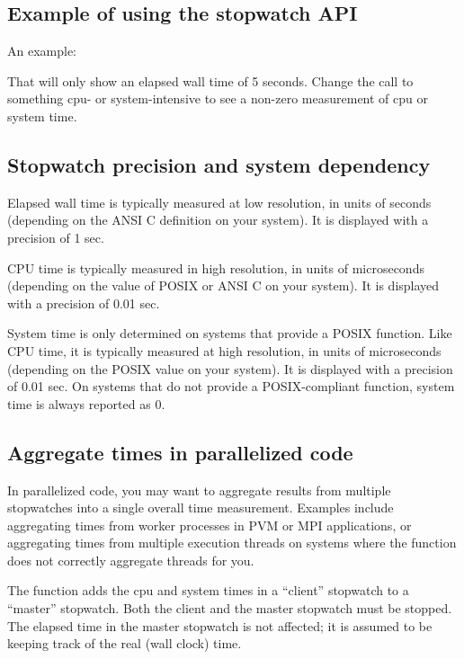 \subsection{Example of using the stopwatch API}

An example:



That will only show an elapsed wall time of 5 seconds.  Change the
 call to something cpu- or system-intensive to see a
non-zero measurement of cpu or system time.

\subsection{Stopwatch precision and system dependency}

Elapsed wall time is typically measured at low resolution, in units of
seconds (depending on the ANSI C  definition on your
system). It is displayed with a precision of 1 sec.

CPU time is typically measured in high resolution, in units of
microseconds (depending on the value of POSIX  or
ANSI C  on your system). It is displayed with a
precision of 0.01 sec.

System time is only determined on systems that provide a POSIX
 function. Like CPU time, it is typically measured at
high resolution, in units of microseconds (depending on the POSIX
 value on your system). It is displayed with a
precision of 0.01 sec.  On systems that do not provide a
POSIX-compliant  function, system time is always
reported as 0.

\subsection{Aggregate times in parallelized code}

In parallelized code, you may want to aggregate results from multiple
stopwatches into a single overall time measurement. Examples include
aggregating times from worker processes in PVM or MPI applications, or
aggregating times from multiple execution threads on systems where the
 function does not correctly aggregate threads for you.

The  function adds the cpu and system
times in a ``client'' stopwatch to a ``master'' stopwatch. Both the
client and the master stopwatch must be stopped. The elapsed time in
the master stopwatch is not affected; it is assumed to be keeping
track of the real (wall clock) time. 




